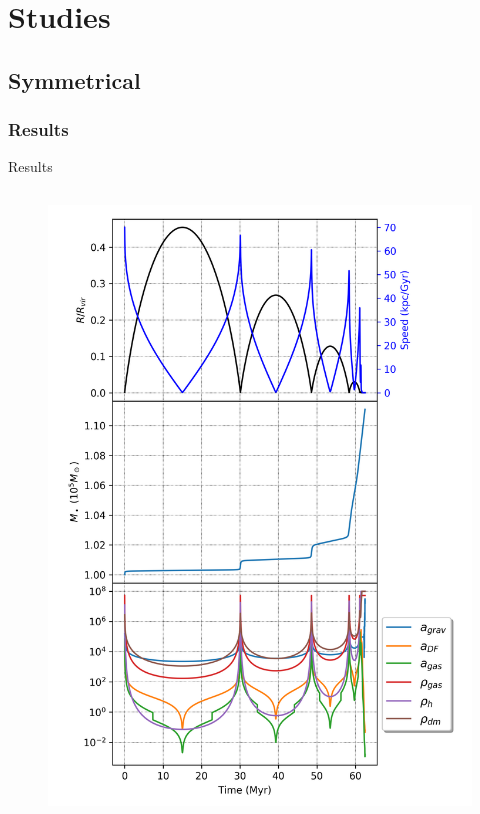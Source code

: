 \documentclass{beamer}
\begin{document}
\section{Studies}
\subsection{Symmetrical}
\subsubsection{Results}
\begin{frame}{Results}
	\begin{columns}
		\begin{column}{0.3\linewidth}
			\begin{figure}[h]
				\centering
				\includegraphics[height=0.7\textheight]{"../Files/Week 6/properties_s02v70"}
			\end{figure}

\end{column}
\end{columns}
\end{frame}
\end{document}
